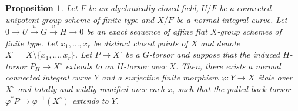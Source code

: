 \documentclass[a4paper,english,12pt]{amsart}
\newtheorem{proposition}[definition]{Proposition}
\numberwithin{equation}{section}
\renewcommand{\_}{\rule{0.25cm}{0.4pt}}
\begin{document}
\begin{proposition}\label{seq unipotente curvas}
    Let $F$ be an algebraically closed field, $U/F$ be a connected unipotent group scheme of finite type and $X/F$ be a normal integral curve. Let $0\to U\xrightarrow{u} G\xrightarrow{v} H\to 0$ be an exact sequence of affine flat $X$-group schemes of finite type. Let $x_{1},\dots, x_{r}$ be distinct closed points of $X$ and denote $X^{\circ}=X\setminus\{x_{1},\dots, x_{r}\}$. Let $P\to X^{\circ}$ be a $G$-torsor and suppose that the induced $H$-torsor $P_{H}\to X^{\circ}$ extends to an $H$-torsor over $X$. Then, there exists a normal connected integral curve $Y$ and a surjective finite morphism $\varphi\colon Y\to X$ étale over $X^{\circ}$ and totally and wildly ramified over each $x_{i}$ such that the pulled-back torsor $\varphi^{\ast}P\to \varphi^{-1}(X^{\circ})$ extends to $Y$.
\end{proposition}
\end{document}
